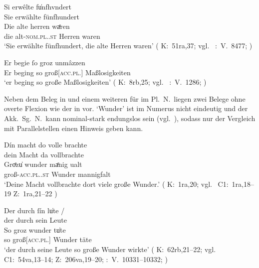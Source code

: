 \begin{exe}
\ex \label{ex:kckregel}
	\begin{xlist}
	\ex \label{ex:kckregel_1}
		\gll Si erwêlte fu̍nfhvndert \\
			Sie erwählte fünfhundert \\
	\sn \gll Die alte herren waͤren \\
			die alt-\textsc{nom.pl.\MascM.st} Herren waren \\
		\trans `Sie erwählte fünfhundert, die alte Herren waren'
			(%
				K:~51ra,37; vgl.~%
				\KC:~V.~8477;
				\cite[237]{schroeder1895}%
			)

	\ex \label{ex:kckregel_2}
		\gll Er begie ſo groz unmâzzen \\
			Er beging so groß[\textsc{acc.pl.\FemI}] Maßlosigkeiten \\
		\trans `er beging so große Maßlosigkeiten'
			(%
				K:~8rb,25; vgl.~%
				\KC:~V.~1286;
				\cite[105]{schroeder1895}%
			)
	\end{xlist}
\end{exe}

Neben dem Beleg in  und einem weiteren für  im
Pl.~N.\ liegen zwei Belege ohne overte Flexion wie der in 
vor.  `Wunder' ist im Numerus nicht eindeutig und
der Akk.\ Sg.\ N.\ kann nominal-stark endungslos sein
(vgl.~), sodass nur der Vergleich mit
Parallelstellen einen Hinweis geben kann.

\begin{exe}
\ex	\begin{xlist}
	\ex \label{ex:kckregel_3}
		\gll Dín macht do {volle brachte} \\
			dein Macht da vollbrachte \\
	\sn \gll Groͤzu̍ wunder {maͤnig ualt} \\
			groß-\textsc{acc.pl.\NeutI.st} Wunder mannigfalt \\
		\trans `Deine Macht vollbrachte dort viele große Wunder.'
			(%
				K:~1ra,20; vgl.~%
				C1:~1ra,18--19%
				Z:~1ra,21--22%
			)

	\ex \label{ex:kckregel_4}
		\gll Der durch ſín lu̍te {/} \\
			der durch sein Leute \\
		\gll So groz wunder tu̍te \\
			so groß[\textsc{acc.pl.\NeutI}] Wunder täte \\
		\trans `der durch seine Leute so große Wunder wirkte'
			(%
				K:~62rb,21--22; vgl.~%
				C1:~54va,13--14;
				Z:~206va,19--20;
				\KC:~V.~10331--10332;
				\cite[271]{schroeder1895}%
			)
	\end{xlist}
\end{exe}

